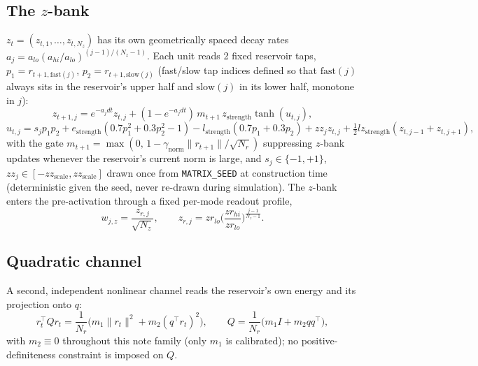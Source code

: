 \documentclass[11pt]{article}
\begin{document}
\subsection{The $z$-bank}
\label{sec:zbank}
$z_t=(z_{t,1},\dots,z_{t,N_z})$ has its own geometrically spaced decay
rates $a_j=a_{lo}(a_{hi}/a_{lo})^{(j-1)/(N_z-1)}$. Each unit reads 2
fixed reservoir taps, $p_1=r_{t+1,\mathrm{fast}(j)}$,
$p_2=r_{t+1,\mathrm{slow}(j)}$ (fast/slow tap indices defined so that
$\mathrm{fast}(j)$ always sits in the reservoir's upper half and
$\mathrm{slow}(j)$ in its lower half, monotone in $j$):
\begin{equation}
z_{t+1,j} = e^{-a_jdt}z_{t,j} + (1-e^{-a_jdt})\, m_{t+1}\,z_{\text{strength}}\tanh(u_{t,j}),
\label{eq:zupdate}
\end{equation}
\begin{equation}
u_{t,j} = s_jp_1p_2 + e_{\text{strength}}(0.7p_1^2+0.3p_2^2-1) - l_{\text{strength}}(0.7p_1+0.3p_2)
+ zz_jz_{t,j} + \tfrac12 lz_{\text{strength}}(z_{t,j-1}+z_{t,j+1}),
\label{eq:udef}
\end{equation}
with the gate $m_{t+1}=\max(0,\,1-\gamma_{\text{norm}}\lVert r_{t+1}\rVert/\sqrt{N_r})$
suppressing $z$-bank updates whenever the reservoir's current norm is
large, and $s_j\in\{-1,+1\}$, $zz_j\in[-zz_{\text{scale}},zz_{\text{scale}}]$
drawn once from \texttt{MATRIX\_SEED} at construction time
(deterministic given the seed, never re-drawn during simulation). The
$z$-bank enters the pre-activation through a fixed per-mode readout
profile,
\begin{equation}
w_{j,z} = \frac{z_{r,j}}{\sqrt{N_z}}, \qquad
z_{r,j} = zr_{lo}\Big(\frac{zr_{hi}}{zr_{lo}}\Big)^{\frac{j-1}{N_z-1}}.
\label{eq:zreadout}
\end{equation}

\subsection{Quadratic channel}
\label{sec:quad}
A second, independent nonlinear channel reads the reservoir's own
energy and its projection onto $q$:
\begin{equation}
r_t^\top Q r_t = \frac{1}{N_r}\Big(m_1\lVert r_t\rVert^2 + m_2(q^\top r_t)^2\Big),
\qquad Q = \frac{1}{N_r}\big(m_1 I + m_2 qq^\top\big),
\label{eq:quad}
\end{equation}
with $m_2\equiv0$ throughout this note family (only $m_1$ is
calibrated); no positive-definiteness constraint is imposed on $Q$.
\end{document}
